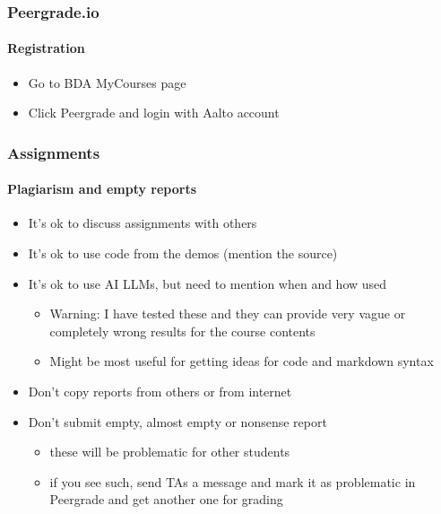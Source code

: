 \documentclass[english,t]{beamer}
\begin{document}
\begin{frame}
  \frametitle{Peergrade.io}  %
  \framesubtitle{Registration}
  \begin{itemize}
  \item Go to BDA MyCourses page
  \item Click Peergrade and login with Aalto account
  \end{itemize}
  
\end{frame}

\begin{frame}
  \frametitle{Assignments}  %
  \framesubtitle{Plagiarism and empty reports}
  \begin{itemize}
  \item It's ok to discuss assignments with others
  \item It's ok to use code from the demos (mention the source)
  \item It's ok to use AI LLMs, but need to mention when and how used
    \begin{itemize}
    \item Warning: I have tested these and they can provide very vague
      or completely wrong results for the course contents
    \item Might be most useful for getting ideas for code and markdown syntax
    \end{itemize}
  \item Don't copy reports from others or from internet
  \item Don't submit empty, almost empty or nonsense report
    \begin{itemize}
    \item these will be problematic for other students
    \item if you see such, send TAs a message and mark it as
      problematic in Peergrade and get another one for grading
    \end{itemize}
  \end{itemize}
  
\end{frame}
\end{document}
